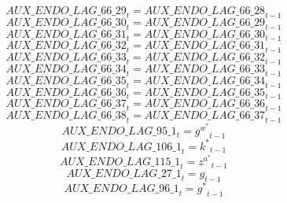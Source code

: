 \begin{dmath}
{AUX\_ENDO\_LAG\_66\_29}_{t}={AUX\_ENDO\_LAG\_66\_28}_{t-1}
\end{dmath}
\begin{dmath}
{AUX\_ENDO\_LAG\_66\_30}_{t}={AUX\_ENDO\_LAG\_66\_29}_{t-1}
\end{dmath}
\begin{dmath}
{AUX\_ENDO\_LAG\_66\_31}_{t}={AUX\_ENDO\_LAG\_66\_30}_{t-1}
\end{dmath}
\begin{dmath}
{AUX\_ENDO\_LAG\_66\_32}_{t}={AUX\_ENDO\_LAG\_66\_31}_{t-1}
\end{dmath}
\begin{dmath}
{AUX\_ENDO\_LAG\_66\_33}_{t}={AUX\_ENDO\_LAG\_66\_32}_{t-1}
\end{dmath}
\begin{dmath}
{AUX\_ENDO\_LAG\_66\_34}_{t}={AUX\_ENDO\_LAG\_66\_33}_{t-1}
\end{dmath}
\begin{dmath}
{AUX\_ENDO\_LAG\_66\_35}_{t}={AUX\_ENDO\_LAG\_66\_34}_{t-1}
\end{dmath}
\begin{dmath}
{AUX\_ENDO\_LAG\_66\_36}_{t}={AUX\_ENDO\_LAG\_66\_35}_{t-1}
\end{dmath}
\begin{dmath}
{AUX\_ENDO\_LAG\_66\_37}_{t}={AUX\_ENDO\_LAG\_66\_36}_{t-1}
\end{dmath}
\begin{dmath}
{AUX\_ENDO\_LAG\_66\_38}_{t}={AUX\_ENDO\_LAG\_66\_37}_{t-1}
\end{dmath}
\begin{dmath}
{AUX\_ENDO\_LAG\_95\_1}_{t}={{g^w^*}}_{t-1}
\end{dmath}
\begin{dmath}
{AUX\_ENDO\_LAG\_106\_1}_{t}={{k^*}}_{t-1}
\end{dmath}
\begin{dmath}
{AUX\_ENDO\_LAG\_115\_1}_{t}={{z^a^*}}_{t-1}
\end{dmath}
\begin{dmath}
{AUX\_ENDO\_LAG\_27\_1}_{t}={{g}}_{t-1}
\end{dmath}
\begin{dmath}
{AUX\_ENDO\_LAG\_96\_1}_{t}={{g^*}}_{t-1}
\end{dmath}
